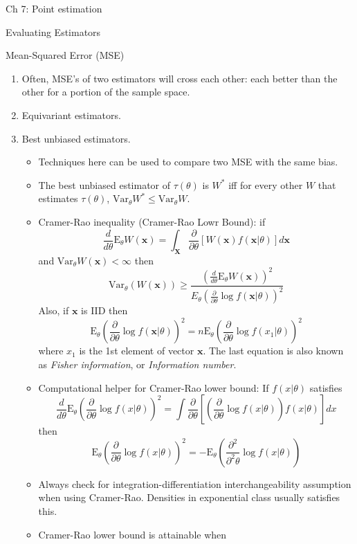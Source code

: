 \documentclass{article}
\newcommand{\E}{\mathrm{E}}
\newcommand{\Var}{\mathrm{Var}}
\newcommand{\bo}[1]{\boldsymbol{#1}}
\newcommand{\deriv}[1]{\frac{d}{d#1}}
\newcommand{\pderiv}[1]{\frac{\partial}{\partial#1}}
\newcommand{\ppderiv}[1]{\frac{\partial^{2}}{\partial^{2}#1}}
\begin{document}
\begin{section}{Ch 7: Point estimation}
\begin{subsection}{Evaluating Estimators}
\begin{subsubsection}{Mean-Squared Error (MSE)}
\begin{enumerate}
\item Often, MSE's of two estimators will cross each other: each better than
the other for a portion of the sample space.
\item Equivariant estimators.
\item Best unbiased estimators.
  \begin{itemize}
  \item Techniques here can be used to compare two MSE with the same bias.
  \item The best unbiased estimator of $\tau(\theta)$ is $W^{*}$ iff for
    every other $W$ that estimates $\tau(\theta)$, $\Var_{\theta} W^{*} \leq
    \Var_{\theta} W$.
  \item Cramer-Rao inequality (Cramer-Rao Lowr Bound): if 
  \[ \frac{d}{d\theta} \E_{\theta} W(\bo{x}) = \int_{\bo{X}} 
     \frac{\partial}{\partial\theta} [W(\bo{x}) f(\bo{x}|\theta)] d\bo{x} \]
  \noindent and $\Var_{\theta} W(\bo{x}) < \infty$ then
  \[ \Var_{\theta}(W(\bo{x})) \geq \frac{\left(\frac{d}{d\theta} 
                                               \E_{\theta} W(\bo{x})\right)^2}
      {E_{\theta}\left(\frac{\partial}{\partial\theta} \log f(\bo{x}|\theta)
                \right)^2} \]
  \noindent Also, if $\bo{x}$ is IID then
  \[ \E_{\theta}\left(\frac{\partial}{\partial\theta} \log f(\bo{x}|\theta)
               \right)^2 = 
     n \E_{\theta}\left(\frac{\partial}{\partial\theta} \log f(x_{1}|\theta)
               \right)^2 \]
  \noindent where $x_{1}$ is the 1st element of vector $\bo{x}$. The last
  equation is also known as \emph{Fisher information}, or 
  \emph{Information number}.
  \item Computational helper for Cramer-Rao lower bound: If $f(x|\theta)$
  satisfies
  \[ \deriv{\theta} \E_{\theta}\left(\pderiv{\theta} \log f(x|\theta) 
                               \right)^2 =
     \int \pderiv{\theta} \left[\left(\pderiv{\theta} \log f(x|\theta)
               \right) f(x|\theta) \right] dx \]
  \noindent then
  \[ \E_{\theta}\left(\pderiv{\theta} \log f(x|\theta) \right)^2 =
     - \E_{\theta} \left(\ppderiv{\theta} \log f(x|\theta) \right) \] 

  \item Always check for integration-differentiation interchangeability
  assumption when using Cramer-Rao. Densities in exponential class usually
  satisfies this.

  \item Cramer-Rao lower bound is attainable when


\end{itemize}
\end{enumerate}
\end{subsubsection}
\end{subsection}
\end{section}
\end{document}
